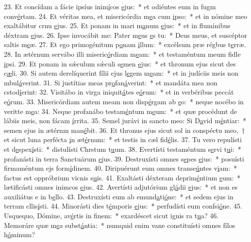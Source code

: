 23. Et concídam a fácie ipsíus inim\uline{í}cos \uline{e}jus:~* et odiéntes eum in fugm conv\uline{é}rtam.
24. Et véritas mea, et misericórdia m\uline{e}a cum \uline{i}pso:~* et in nómine meo exaltábitur crnu \uline{e}jus.
25. Et ponam in mari m\uline{a}num \uline{e}jus:~* et in flumínibus déxtram \uline{e}jus.
26. Ipse invocábit me: Pater m\uline{e}us \uline{e}s tu:~* Deus meus, et suscéptor saltis m\uline{e}æ.
27. Et ego primogénitum p\uline{o}nam \uline{i}llum:~* excélsum præ régbus t\uline{e}rræ.
28. In ætérnum servábo illi miseric\uline{ó}rdiam m\uline{e}am:~* et testaméntum meum fidle \uline{i}psi.
29. Et ponam in sǽculum sǽculi s\uline{e}men \uline{e}jus:~* et thronum ejus sicut des c\uline{æ}li.
30. Si autem derelíquerint fílii ejus l\uline{e}gem m\uline{e}am:~* et in judíciis meis non mbul\uline{á}verint.
31. Si justítias meas pr\uline{o}fan\uline{á}verint:~* et mandáta mea non cstod\uline{í}erint:
32. Visitábo in virga iniquit\uline{á}tes e\uline{ó}rum:~* et in verbéribus peccát e\uline{ó}rum.
33. Misericórdiam autem meam non disp\uline{é}rgam ab \uline{e}o:~* neque nocébo in veritte m\uline{e}a:
34. Neque profanábo testam\uline{é}ntum m\uline{e}um:~* et quæ procédunt de lábiis meis, non fácam \uline{í}rrita.
35. Semel jurávi in sancto meo: Si D\uline{a}vid m\uline{é}ntiar:~* semen ejus in ætérnm man\uline{é}bit.
36. Et thronus ejus sicut sol in conspéctu meo,~† et sicut luna perfécta \uline{i}n æt\uline{é}rnum:~* et testis in cæl fid\uline{é}lis.
37. Tu vero repulísti et d\uline{e}spex\uline{í}sti:~* distulísti Chrstum t\uline{u}um.
38. Evertísti testaméntum s\uline{e}rvi t\uline{u}i:~* profanásti in terra Sanctuárum \uline{e}jus.
39. Destruxísti omnes s\uline{e}pes \uline{e}jus:~* posuísti firmaméntum ejs form\uline{í}dinem.
40. Diripuérunt eum omnes transe\uline{ú}ntes v\uline{i}am:~* factus est oppróbrium vicnis s\uline{u}is.
41. Exaltásti déxteram deprim\uline{é}ntium \uline{e}um:~* lætificásti omnes inimcos \uline{e}jus.
42. Avertísti adjutórium gl\uline{á}dii \uline{e}jus:~* et non es auxiliátus e in b\uline{e}llo.
43. Destruxísti eum ab emund\uline{a}ti\uline{ó}ne:~* et sedem ejus in terram cllis\uline{í}sti.
44. Minorásti dies t\uline{é}mporis \uline{e}jus:~* perfudísti eum confsi\uline{ó}ne.
45. Usquequo, Dómine, av\uline{é}rtis in f\uline{i}nem:~* exardéscet sicut ignis ra t\uline{u}a?
46. Memoráre quæ m\uline{e}a subst\uline{á}ntia:~* numquid enim vane constituísti omnes fílos h\uline{ó}minum?
